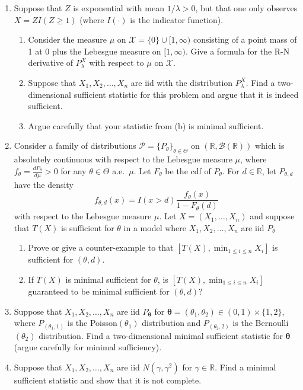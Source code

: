 \documentclass[11pt]{article}
\begin{document}
\begin{enumerate}
\newpage

\item Suppose that $Z$ is exponential with mean $1/\lambda>0$, but that one only observes $X = Z I(Z \geq 1)$ (where $I(\cdot)$ is the indicator function).
    \begin{enumerate}
    \item Consider the measure $\mu$ on $\mathcal{X} = \{0\}\cup [1,\infty)$ consisting of a point mass of 1 at 0 plus the Lebesgue measure on $[1,\infty)$.  Give a formula for the R-N derivative of $P_\lambda^X$ with respect to $\mu$ on $\mathcal{X}$.
        \item Suppose that $X_1,X_2,\ldots,X_n$ are iid with the distribution $P_\lambda^X$.  Find a two-dimensional sufficient statistic for this problem and argue that it is indeed sufficient.
            \item Argue carefully that your statistic from (b) is minimal sufficient.
 \end{enumerate}

\item Consider a family of distributions $\mathcal{P}=\{P_\theta\}_{\theta\in \Theta}$ on $(\mathbb{R},\mathcal{B}(\mathbb{R}))$ which is absolutely continuous with respect to the Lebesgue measure $\mu$, where $f_\theta=\frac{d P_\theta}{d \mu}>0$ for any $\theta\in \Theta$ a.e.~$\mu$.  Let $F_\theta$ be the cdf of $P_\theta$.  For $d\in \mathbb{R}$, let $P_{\theta,d}$ have the density
    \[
      f_{\theta,d}(x) = I(x>d) \frac{f_\theta(x)}{1-F_\theta(d)}
    \]
with respect to the Lebesgue measure $\mu$.  Let $X=(X_1,\ldots,X_n)$ and suppose that $T(X)$ is sufficient for $\theta$ in a model where $X_1,X_2,\ldots,X_n$ are iid $P_\theta$

\begin{enumerate}
\item Prove or give a counter-example to that $[T(X),\min_{1\leq i \leq n} X_i]$ is sufficient for $(\theta,d)$.
\item If $T(X)$ is minimal sufficient for $\theta$, is $[T(X),\min_{1\leq i \leq n} X_i]$ guaranteed to be minimal sufficient for $(\theta,d)$?
\end{enumerate}
\item  Suppose that $X_1,X_2,\ldots,X_n$ are iid $P_{\bm{\theta}}$ for $\bm{\theta}=(\theta_1,\theta_2)\in(0,1)\times\{1,2\}$, where $P_{(\theta_1,1)}$ is the Poisson$(\theta_1)$ distribution and $P_{(\theta_2,2)}$ is the Bernoulli$(\theta_2)$ distribution.  Find a two-dimensional minimal sufficient statistic for $\bm{\theta}$ (argue carefully for minimal sufficiency).
\item Suppose that $X_1,X_2,\ldots,X_n$ are iid $N(\gamma,\gamma^2)$ for $\gamma\in\mathbb{R}$.  Find a minimal sufficient statistic and show that it is not complete.
\end{enumerate}
\end{document}
